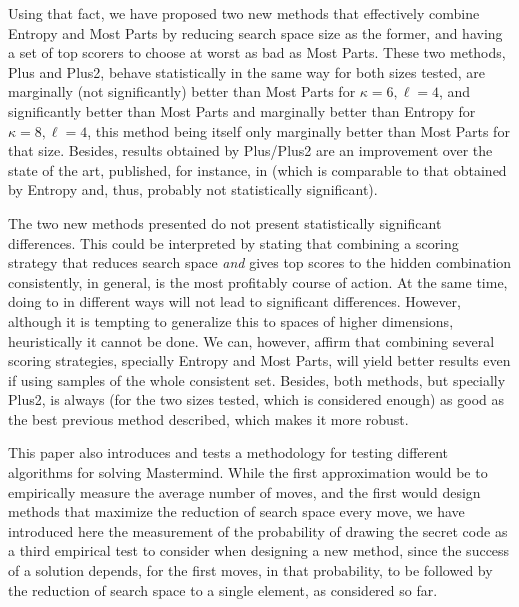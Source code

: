 \documentclass[preprint,12pt]{elsarticle}
\begin{document}
Using that fact, we have proposed two new methods that effectively
combine Entropy and Most Parts by reducing search space size as the
former, and having a set of top scorers to choose at worst as bad as
Most Parts. These two methods, Plus and Plus2, behave statistically in
the same way for both sizes tested, are marginally (not significantly)
better than Most Parts for $\kappa=6, \ell=4$, and significantly
better than Most Parts and marginally better than Entropy for
$\kappa=8, \ell=4$, this method being itself only marginally better
than Most Parts for that size. Besides, results obtained by Plus/Plus2
are an improvement over the state of the art, published, for instance,
in \cite{DBLP:conf/cec/GuervosMC11} (which is comparable to that
obtained by Entropy and, thus, probably not statistically
significant). 

The two new methods presented do not present statistically significant
differences. This could be interpreted by stating that combining a scoring
strategy that reduces search space {\em and} gives top scores to the
hidden combination consistently, in general, is the most profitably
course of action. At the same time, doing to in different ways will
not lead to significant differences. However, although it is tempting
to generalize this to spaces of higher dimensions, heuristically it
cannot be done. We can, however, affirm that combining several scoring
strategies, specially Entropy and Most Parts, will yield better
results even if using samples of the whole consistent set. Besides,
both methods, but specially Plus2, is always (for the two sizes
tested, which is considered enough) as good as the best previous
method described, which makes it more robust.

This paper also introduces and tests a methodology for testing
different algorithms for solving Mastermind. While the first
approximation would be to empirically measure the average number of
moves, and the first would design methods that maximize the reduction
of search space every move, we have introduced here the measurement of
the probability of drawing the secret code as a third empirical test
to consider when designing a new method, since the success of a
solution depends, for the first moves, in that probability, to be
followed by the reduction of search space to a single element, as
considered so far.
\end{document}
